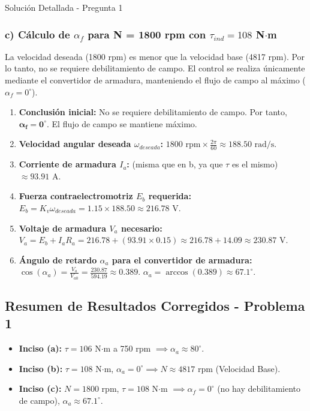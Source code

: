 \documentclass[12pt]{article}
\begin{document}
\begin{solutionbox}{Solución Detallada - Pregunta 1}
\subsubsection*{c) Cálculo de $\alpha_f$ para N = 1800 rpm con $\tau_{ind} = 108$ N$\cdot$m}
La velocidad deseada (1800 rpm) es menor que la velocidad base (4817 rpm). Por lo tanto, no se requiere debilitamiento de campo. El control se realiza únicamente mediante el convertidor de armadura, manteniendo el flujo de campo al máximo ($\alpha_f = 0^{\circ}$). 
\begin{enumerate}
    \item \textbf{Conclusión inicial:} No se requiere debilitamiento de campo. Por tanto, $\mathbf{\alpha_f = 0^{\circ}}$. El flujo de campo se mantiene máximo.
    \item \textbf{Velocidad angular deseada $\omega_{deseada}$:} $1800 \text{ rpm} \times \frac{2\pi}{60} \approx 188.50 \text{ rad/s}$.
    \item \textbf{Corriente de armadura $I_a$:} (misma que en b, ya que $\tau$ es el mismo) $\approx 93.91 \text{ A}$.
    \item \textbf{Fuerza contraelectromotriz $E_b$ requerida:} $E_b = K_v \omega_{deseada} = 1.15 \times 188.50 \approx 216.78 \text{ V}$.
    \item \textbf{Voltaje de armadura $V_a$ necesario:} $V_a = E_b + I_a R_a = 216.78 + (93.91 \times 0.15) \approx 216.78 + 14.09 \approx 230.87 \text{ V}$.
    \item \textbf{Ángulo de retardo $\alpha_a$ para el convertidor de armadura:} $\cos(\alpha_a) = \frac{V_a}{V_{a0}} = \frac{230.87}{594.19} \approx 0.389$. $\alpha_a = \arccos(0.389) \approx \mathbf{67.1^{\circ}}$.
\end{enumerate}

\subsection*{Resumen de Resultados Corregidos - Problema 1}
\begin{itemize}
    \item \textbf{Inciso (a):} $\tau = 106$ N$\cdot$m a 750 rpm $\implies \alpha_a \approx 80^{\circ}$.
    \item \textbf{Inciso (b):} $\tau = 108$ N$\cdot$m, $\alpha_a = 0^{\circ} \implies N \approx 4817$ rpm (Velocidad Base).
    \item \textbf{Inciso (c):} $N = 1800$ rpm, $\tau = 108$ N$\cdot$m $\implies \alpha_f = 0^{\circ}$ (no hay debilitamiento de campo), $\alpha_a \approx 67.1^{\circ}$.
\end{itemize}


\end{solutionbox}
\end{document}
